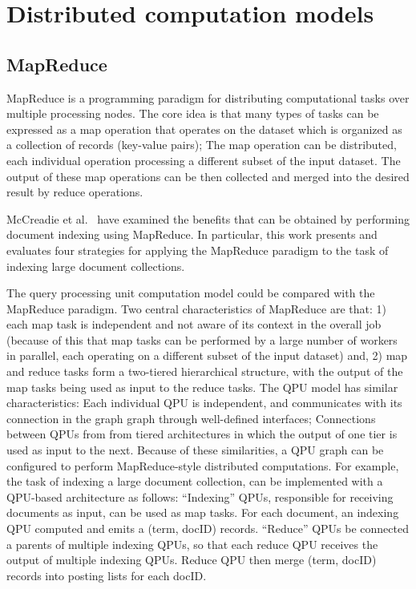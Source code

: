 \section{Distributed computation models}
\label{sec:dataflowmapreduce}

\subsection{MapReduce}

MapReduce \cite{dean:mapreduce} is a programming paradigm for distributing computational tasks over multiple processing nodes.
The core idea is that many types of tasks can be expressed as a map operation that operates on the dataset which is organized
as a collection of records (key-value pairs);
The map operation can be distributed, each individual operation processing a different subset of the input dataset.
The output of these map operations can be then collected and merged into the desired result by reduce operations.

McCreadie et al.\ \cite{mccreadie:mapreduceindexing} have examined the benefits that can be obtained by performing document
indexing using MapReduce.
In particular, this work presents and evaluates four strategies for applying the MapReduce paradigm
to the task of indexing large document collections.

The query processing unit computation model could be compared with the MapReduce paradigm.
Two central characteristics of MapReduce are that:
1) each map task is independent and not aware of its context in the overall job
(because of this that map tasks can be performed by a large number of workers in parallel, each operating on a different
subset of the input dataset)
and, 2) map and reduce tasks form a two-tiered hierarchical structure,
with the output of the map tasks being used as input to the reduce tasks.
The QPU model has similar characteristics:
Each individual QPU is independent, and communicates with its connection in the graph graph through well-defined interfaces;
Connections between QPUs from from tiered architectures in which the output of one tier is used as input to the next.
Because of these similarities, a QPU graph can be configured to perform MapReduce-style distributed computations.
For example, the task of indexing a large document collection, can be implemented with a QPU-based architecture
as follows:
``Indexing'' QPUs, responsible for receiving documents as input, can be used as map tasks.
For each document, an indexing QPU computed and emits a (term, docID) records.
``Reduce'' QPUs be connected a parents of multiple indexing QPUs,
so that each reduce QPU receives the output of multiple indexing QPUs.
Reduce QPU then merge (term, docID) records into posting lists for each docID.

